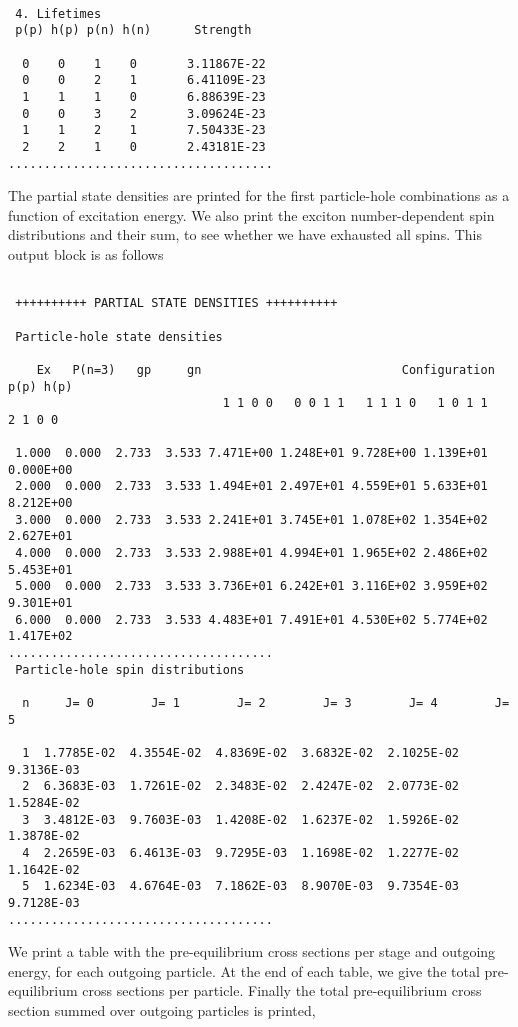 \begin{samplecase}
{\small \begin{verbatim}

 4. Lifetimes
 p(p) h(p) p(n) h(n)      Strength

  0    0    1    0       3.11867E-22
  0    0    2    1       6.41109E-23
  1    1    1    0       6.88639E-23
  0    0    3    2       3.09624E-23
  1    1    2    1       7.50433E-23
  2    2    1    0       2.43181E-23
.....................................
\end{verbatim} } \renewcommand{\baselinestretch}{1.07}\small\normalsize
\noindent
The partial state densities are printed for the first particle-hole 
combinations as a function of excitation energy. We also print the exciton 
number-dependent spin distributions and their sum, to see whether we have 
exhausted all spins. This output block is as follows

{\small \begin{verbatim}

 ++++++++++ PARTIAL STATE DENSITIES ++++++++++

 Particle-hole state densities

    Ex   P(n=3)   gp     gn                            Configuration p(p) h(p) 
                              1 1 0 0   0 0 1 1   1 1 1 0   1 0 1 1   2 1 0 0  

 1.000  0.000  2.733  3.533 7.471E+00 1.248E+01 9.728E+00 1.139E+01 0.000E+00 
 2.000  0.000  2.733  3.533 1.494E+01 2.497E+01 4.559E+01 5.633E+01 8.212E+00 
 3.000  0.000  2.733  3.533 2.241E+01 3.745E+01 1.078E+02 1.354E+02 2.627E+01 
 4.000  0.000  2.733  3.533 2.988E+01 4.994E+01 1.965E+02 2.486E+02 5.453E+01 
 5.000  0.000  2.733  3.533 3.736E+01 6.242E+01 3.116E+02 3.959E+02 9.301E+01 
 6.000  0.000  2.733  3.533 4.483E+01 7.491E+01 4.530E+02 5.774E+02 1.417E+02 
.....................................
 Particle-hole spin distributions

  n     J= 0        J= 1        J= 2        J= 3        J= 4        J= 5       
 
  1  1.7785E-02  4.3554E-02  4.8369E-02  3.6832E-02  2.1025E-02  9.3136E-03  
  2  6.3683E-03  1.7261E-02  2.3483E-02  2.4247E-02  2.0773E-02  1.5284E-02  
  3  3.4812E-03  9.7603E-03  1.4208E-02  1.6237E-02  1.5926E-02  1.3878E-02  
  4  2.2659E-03  6.4613E-03  9.7295E-03  1.1698E-02  1.2277E-02  1.1642E-02  
  5  1.6234E-03  4.6764E-03  7.1862E-03  8.9070E-03  9.7354E-03  9.7128E-03  
.....................................
\end{verbatim} } \renewcommand{\baselinestretch}{1.07}\small\normalsize
\noindent
We print a table with the pre-equilibrium cross sections per stage and outgoing 
energy, for each outgoing particle. At the end of each table, we give the total
pre-equilibrium cross sections per particle. Finally the total pre-equilibrium 
cross section summed over outgoing particles is printed,


\end{samplecase}

